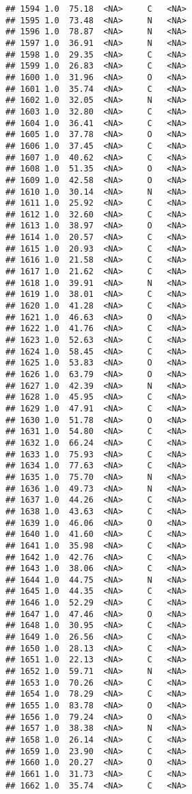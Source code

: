 \documentclass[
]{article}
\begin{document}
\begin{verbatim}
## 1594 1.0  75.18  <NA>     C   <NA>
## 1595 1.0  73.48  <NA>     N   <NA>
## 1596 1.0  78.87  <NA>     N   <NA>
## 1597 1.0  36.91  <NA>     N   <NA>
## 1598 1.0  29.35  <NA>     C   <NA>
## 1599 1.0  26.83  <NA>     C   <NA>
## 1600 1.0  31.96  <NA>     O   <NA>
## 1601 1.0  35.74  <NA>     C   <NA>
## 1602 1.0  32.05  <NA>     N   <NA>
## 1603 1.0  32.80  <NA>     C   <NA>
## 1604 1.0  36.41  <NA>     C   <NA>
## 1605 1.0  37.78  <NA>     O   <NA>
## 1606 1.0  37.45  <NA>     C   <NA>
## 1607 1.0  40.62  <NA>     C   <NA>
## 1608 1.0  51.35  <NA>     O   <NA>
## 1609 1.0  42.58  <NA>     O   <NA>
## 1610 1.0  30.14  <NA>     N   <NA>
## 1611 1.0  25.92  <NA>     C   <NA>
## 1612 1.0  32.60  <NA>     C   <NA>
## 1613 1.0  38.97  <NA>     O   <NA>
## 1614 1.0  20.57  <NA>     C   <NA>
## 1615 1.0  20.93  <NA>     C   <NA>
## 1616 1.0  21.58  <NA>     C   <NA>
## 1617 1.0  21.62  <NA>     C   <NA>
## 1618 1.0  39.91  <NA>     N   <NA>
## 1619 1.0  38.01  <NA>     C   <NA>
## 1620 1.0  41.28  <NA>     C   <NA>
## 1621 1.0  46.63  <NA>     O   <NA>
## 1622 1.0  41.76  <NA>     C   <NA>
## 1623 1.0  52.63  <NA>     C   <NA>
## 1624 1.0  58.45  <NA>     C   <NA>
## 1625 1.0  53.83  <NA>     O   <NA>
## 1626 1.0  63.79  <NA>     O   <NA>
## 1627 1.0  42.39  <NA>     N   <NA>
## 1628 1.0  45.95  <NA>     C   <NA>
## 1629 1.0  47.91  <NA>     C   <NA>
## 1630 1.0  51.78  <NA>     O   <NA>
## 1631 1.0  54.80  <NA>     C   <NA>
## 1632 1.0  66.24  <NA>     C   <NA>
## 1633 1.0  75.93  <NA>     C   <NA>
## 1634 1.0  77.63  <NA>     C   <NA>
## 1635 1.0  75.70  <NA>     N   <NA>
## 1636 1.0  49.73  <NA>     N   <NA>
## 1637 1.0  44.26  <NA>     C   <NA>
## 1638 1.0  43.63  <NA>     C   <NA>
## 1639 1.0  46.06  <NA>     O   <NA>
## 1640 1.0  41.60  <NA>     C   <NA>
## 1641 1.0  35.98  <NA>     C   <NA>
## 1642 1.0  42.76  <NA>     C   <NA>
## 1643 1.0  38.06  <NA>     C   <NA>
## 1644 1.0  44.75  <NA>     N   <NA>
## 1645 1.0  44.35  <NA>     C   <NA>
## 1646 1.0  52.29  <NA>     C   <NA>
## 1647 1.0  47.46  <NA>     O   <NA>
## 1648 1.0  30.95  <NA>     C   <NA>
## 1649 1.0  26.56  <NA>     C   <NA>
## 1650 1.0  28.13  <NA>     C   <NA>
## 1651 1.0  22.13  <NA>     C   <NA>
## 1652 1.0  59.71  <NA>     N   <NA>
## 1653 1.0  70.26  <NA>     C   <NA>
## 1654 1.0  78.29  <NA>     C   <NA>
## 1655 1.0  83.78  <NA>     O   <NA>
## 1656 1.0  79.24  <NA>     O   <NA>
## 1657 1.0  38.38  <NA>     N   <NA>
## 1658 1.0  26.14  <NA>     C   <NA>
## 1659 1.0  23.90  <NA>     C   <NA>
## 1660 1.0  20.27  <NA>     O   <NA>
## 1661 1.0  31.73  <NA>     C   <NA>
## 1662 1.0  35.74  <NA>     C   <NA>

\end{verbatim}
\end{document}
